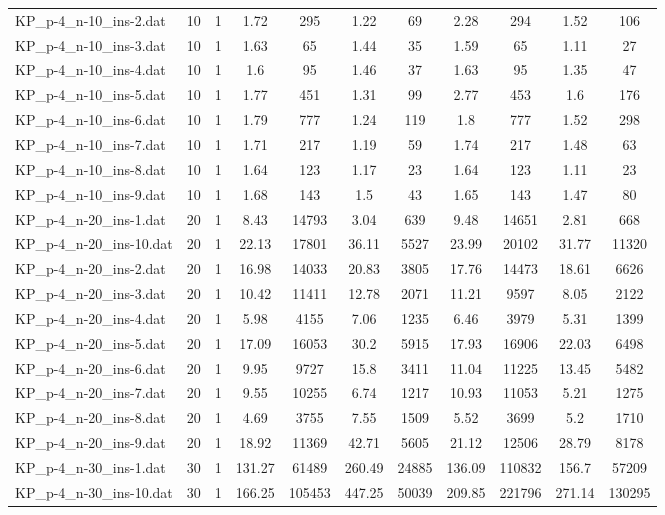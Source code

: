 \begin{table}[!ht]
\begin{tabular}{lcccccccccc}
KP\_p-4\_n-10\_ins-2.dat & 10 & 1 & 1.72 & 295 & 1.22 & 69 & 2.28 & 294 & 1.52 & 106 \\
KP\_p-4\_n-10\_ins-3.dat & 10 & 1 & 1.63 & 65 & 1.44 & 35 & 1.59 & 65 & 1.11 & 27 \\
KP\_p-4\_n-10\_ins-4.dat & 10 & 1 & 1.6 & 95 & 1.46 & 37 & 1.63 & 95 & 1.35 & 47 \\
KP\_p-4\_n-10\_ins-5.dat & 10 & 1 & 1.77 & 451 & 1.31 & 99 & 2.77 & 453 & 1.6 & 176 \\
KP\_p-4\_n-10\_ins-6.dat & 10 & 1 & 1.79 & 777 & 1.24 & 119 & 1.8 & 777 & 1.52 & 298 \\
KP\_p-4\_n-10\_ins-7.dat & 10 & 1 & 1.71 & 217 & 1.19 & 59 & 1.74 & 217 & 1.48 & 63 \\
KP\_p-4\_n-10\_ins-8.dat & 10 & 1 & 1.64 & 123 & 1.17 & 23 & 1.64 & 123 & 1.11 & 23 \\
KP\_p-4\_n-10\_ins-9.dat & 10 & 1 & 1.68 & 143 & 1.5 & 43 & 1.65 & 143 & 1.47 & 80 \\
KP\_p-4\_n-20\_ins-1.dat & 20 & 1 & 8.43 & 14793 & 3.04 & 639 & 9.48 & 14651 & 2.81 & 668 \\
KP\_p-4\_n-20\_ins-10.dat & 20 & 1 & 22.13 & 17801 & 36.11 & 5527 & 23.99 & 20102 & 31.77 & 11320 \\
KP\_p-4\_n-20\_ins-2.dat & 20 & 1 & 16.98 & 14033 & 20.83 & 3805 & 17.76 & 14473 & 18.61 & 6626 \\
KP\_p-4\_n-20\_ins-3.dat & 20 & 1 & 10.42 & 11411 & 12.78 & 2071 & 11.21 & 9597 & 8.05 & 2122 \\
KP\_p-4\_n-20\_ins-4.dat & 20 & 1 & 5.98 & 4155 & 7.06 & 1235 & 6.46 & 3979 & 5.31 & 1399 \\
KP\_p-4\_n-20\_ins-5.dat & 20 & 1 & 17.09 & 16053 & 30.2 & 5915 & 17.93 & 16906 & 22.03 & 6498 \\
KP\_p-4\_n-20\_ins-6.dat & 20 & 1 & 9.95 & 9727 & 15.8 & 3411 & 11.04 & 11225 & 13.45 & 5482 \\
KP\_p-4\_n-20\_ins-7.dat & 20 & 1 & 9.55 & 10255 & 6.74 & 1217 & 10.93 & 11053 & 5.21 & 1275 \\
KP\_p-4\_n-20\_ins-8.dat & 20 & 1 & 4.69 & 3755 & 7.55 & 1509 & 5.52 & 3699 & 5.2 & 1710 \\
KP\_p-4\_n-20\_ins-9.dat & 20 & 1 & 18.92 & 11369 & 42.71 & 5605 & 21.12 & 12506 & 28.79 & 8178 \\
KP\_p-4\_n-30\_ins-1.dat & 30 & 1 & 131.27 & 61489 & 260.49 & 24885 & 136.09 & 110832 & 156.7 & 57209 \\
KP\_p-4\_n-30\_ins-10.dat & 30 & 1 & 166.25 & 105453 & 447.25 & 50039 & 209.85 & 221796 & 271.14 & 130295 \\

\end{tabular}
\end{table}
